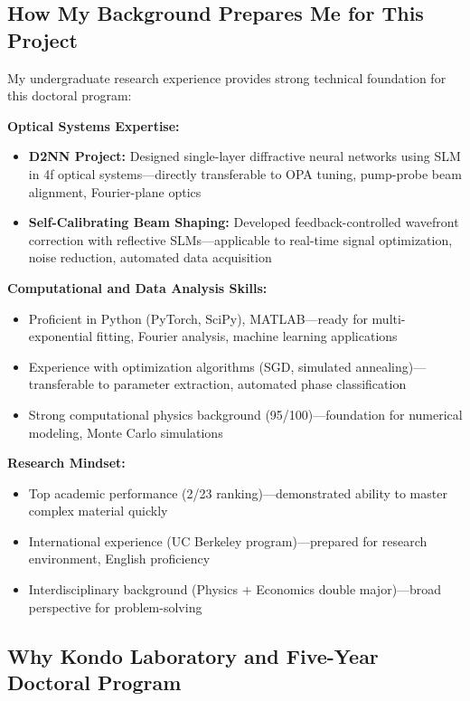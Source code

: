 \documentclass[12pt,a4paper]{article}
\begin{document}
\subsection{How My Background Prepares Me for This Project}

My undergraduate research experience provides strong technical foundation for this doctoral program:

\textbf{Optical Systems Expertise:}
\begin{itemize}
    \item \textbf{D2NN Project:} Designed single-layer diffractive neural networks using SLM in 4f optical systems—directly transferable to OPA tuning, pump-probe beam alignment, Fourier-plane optics
    \item \textbf{Self-Calibrating Beam Shaping:} Developed feedback-controlled wavefront correction with reflective SLMs—applicable to real-time signal optimization, noise reduction, automated data acquisition
\end{itemize}

\textbf{Computational and Data Analysis Skills:}
\begin{itemize}
    \item Proficient in Python (PyTorch, SciPy), MATLAB—ready for multi-exponential fitting, Fourier analysis, machine learning applications
    \item Experience with optimization algorithms (SGD, simulated annealing)—transferable to parameter extraction, automated phase classification
    \item Strong computational physics background (95/100)—foundation for numerical modeling, Monte Carlo simulations
\end{itemize}

\textbf{Research Mindset:}
\begin{itemize}
    \item Top academic performance (2/23 ranking)—demonstrated ability to master complex material quickly
    \item International experience (UC Berkeley program)—prepared for research environment, English proficiency
    \item Interdisciplinary background (Physics + Economics double major)—broad perspective for problem-solving
\end{itemize}

\subsection{Why Kondo Laboratory and Five-Year Doctoral Program}
\end{document}
